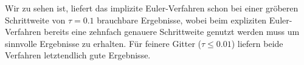 \documentclass[11pt,a4paper,ngerman]{article}
\begin{document}
Wir zu sehen ist, liefert das implizite Euler-Verfahren schon bei einer gröberen Schrittweite von $\tau = 0.1$ brauchbare Ergebnisse, wobei beim expliziten Euler-Verfahren bereits eine zehnfach genauere Schrittweite genutzt werden muss um sinnvolle Ergebnisse zu erhalten. Für feinere Gitter ($\tau \leq 0.01$) liefern beide Verfahren letztendlich gute Ergebnisse.



\label{LastPage}
\end{document}

